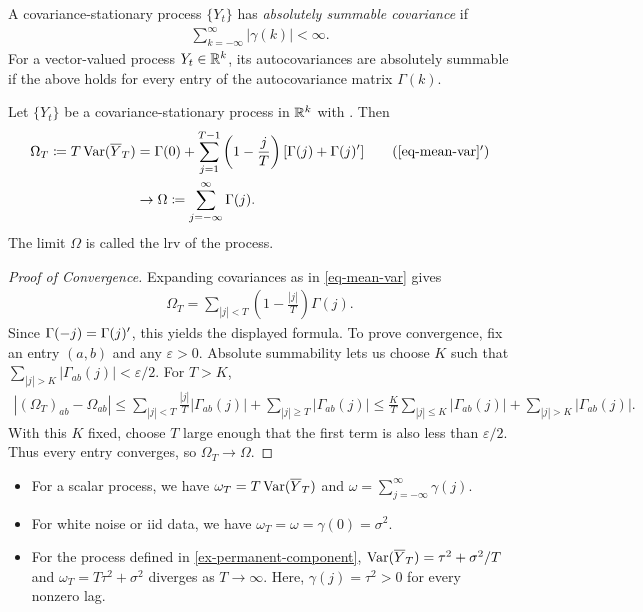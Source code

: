 \documentclass[a4paper,12pt]{article}
\begin{document}
\begin{definition}\label{def-absolutely-summable}
	A covariance-stationary process $\{Y_t\}$ has \emph{absolutely summable covariance} if
	\begin{align}
		\sum_{k=-\infty}^{\infty}|\gamma(k)|<\infty.
	\end{align}
	For a vector-valued process $Y_t\in\mathbb{R}^k$,
	its autocovariances are absolutely summable if the above holds for every entry of the autocovariance matrix $\Gamma(k)$.
\end{definition}

\begin{definition}\label{def-lrv}
	Let $\{Y_t\}$ be a covariance-stationary process in $\mathbb{R}^k$ with .
	Then
	\begin{align}
		\Omega_T\coloneqq T\Var(\overline Y_T)
		&=\Gamma(0)+\sum_{j=1}^{T-1}\left(1-\frac jT\right)
		[\Gamma(j)+\Gamma(j)\T]\tag{\ref{eq-mean-var}$'$}\\
		&\to\Omega\coloneqq\sum_{j=-\infty}^{\infty}\Gamma(j).\label{eq-lrv}
	\end{align}
	The limit $\Omega$ is called the \gls{lrv} of the process.
\end{definition}
\begin{proof}[Proof of Convergence]
	Expanding covariances as in \eqref{eq-mean-var} gives
	\begin{align*}
		\Omega_T=\sum_{|j|<T}\left(1-\frac{|j|}{T}\right)\Gamma(j).
	\end{align*}
	Since $\Gamma(-j)=\Gamma(j)^{\prime}$, this yields the displayed formula.
	To prove convergence, fix an entry $(a,b)$ and any $\varepsilon>0$.
	Absolute summability lets us choose $K$ such that
	$\sum_{|j|>K}|\Gamma_{ab}(j)|<\varepsilon/2$.
	For $T>K$,
	\begin{align*}
		|(\Omega_T)_{ab}-\Omega_{ab}|
		\le\sum_{|j|<T}\frac{|j|}{T}|\Gamma_{ab}(j)|
		+\sum_{|j|\ge T}|\Gamma_{ab}(j)|
		\le\frac KT\sum_{|j|\le K}|\Gamma_{ab}(j)|
		+\sum_{|j|>K}|\Gamma_{ab}(j)|.
	\end{align*}
	With this $K$ fixed, choose $T$ large enough that the first term is also less than $\varepsilon/2$.
	Thus every entry converges, so $\Omega_T\to\Omega$.
\end{proof}

\begin{remark}\leavevmode
	\begin{itemize}
		\item
			For a scalar process, we have $\omega_T=T\operatorname{\text{\upshape{Var}}}(\overline Y_T)$ and
			$\omega=\sum_{j=-\infty}^{\infty}\gamma(j)$.
		\item
			For white noise or \gls{iid} data, we have $\omega_T=\omega=\gamma(0)=\sigma^2$.
		\item
			For the process defined in \autoref{ex-permanent-component},
			$\operatorname{\text{\upshape{Var}}}(\overline Y_T)=\tau^2+\sigma^2/T$ and $\omega_T=T\tau^2+\sigma^2$ diverges as $T\to\infty$.
			Here, $\gamma(j)=\tau^2>0$ for every nonzero lag.
	\end{itemize}
\end{remark}
\end{document}
